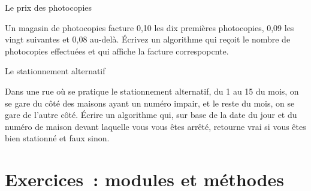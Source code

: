 		\begin{Exercice}{Le prix des photocopies}

			Un magasin de photocopies facture 0,10 \texteuro{} 
			les dix premières photocopies, 
			0,09 \texteuro{} les vingt suivantes 
			et 0,08 \texteuro{} au-delà. 
			Écrivez un algorithme 
			qui reçoit le nombre de photocopies effectuées 
			et qui affiche la facture correspopcnte.
		\end{Exercice}

		\begin{Exercice}{Le stationnement alternatif}

			Dans une rue où se pratique le stationnement alternatif, 
			du 1 au 15 du mois, on se gare du côté des maisons ayant un numéro impair, 
			et le reste du mois, on se gare de l’autre côté. 
			Écrire un algorithme qui, sur base de la date du jour et du numéro de maison
			devant laquelle vous vous êtes arrêté, 
			retourne vrai si vous êtes bien stationné et faux sinon.
		\end{Exercice}





\section{Exercices~: modules et méthodes}

